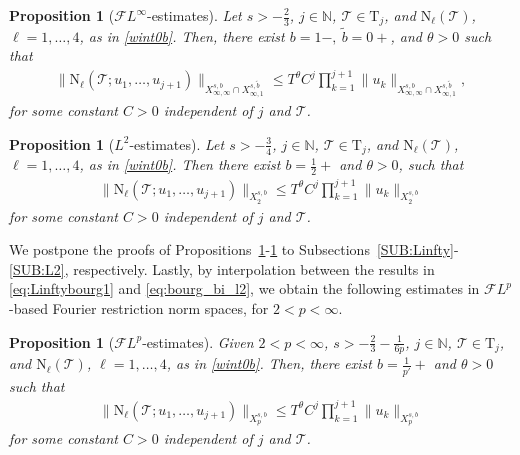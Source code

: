 \documentclass[%
11pt,  reqno]{amsart}
\newcommand{\5}{\textup{V}}
\newcommand{\FL}{\mathcal{F} L}
\newcommand{\wt}{\widetilde}
\newtheorem{proposition}[theorem]{Proposition}
\theoremstyle{remark}
\newcommand{\TT}{\mathcal{T}}
\newcommand{\Tr}{\mathrm{T}}
\newcommand{\bfrak}{\mathfrak{b}}
\newcommand{\gfrak}{\mathfrak{g}}
\newcommand{\ta}{\theta}
\renewcommand{\l}{\ell}
\newcommand{\N}{\mathbb{N}}
\numberwithin{equation}{section}
\numberwithin{theorem}{section}
\newcommand{\NN}{\mathrm{N}}
\begin{document}
\begin{proposition}[$\FL^\infty$-estimates]\label{prop:bourgLinfty}
Let $s>-\frac23$, $j \in\N$, $\TT \in \Tr_j$, and $\NN_\l(\TT)$, $\l=1,\dots, 4$, as in \eqref{wint0b}. Then, there exist 
$b=1-,\ \tilde{b}=0+$, and $\ta>0$ such that
	\begin{align}
		\| \NN_\l(\TT; u_1,\dots, u_{j+1})\|_{X^{s,b}_{\infty, \infty}\cap X^{s,\wt b}_{\infty, 1}} \le T^\ta C^j\prod_{k=1}^{j+1}\|u_k\|_{X^{s,b}_{\infty, \infty}\cap X^{s,\tilde{b}}_{\infty,1}}, \label{eq:Linftybourg1} 
	\end{align}
for some constant $C>0$ independent of $j$ and $\TT$. 
\end{proposition}



\begin{proposition}[$L^2$-estimates]\label{prop:bourgL2}
Let $s>-\frac34$, $j \in\N$, $\TT \in \Tr_j$, and $\NN_\l(\TT)$, $\l=1,\dots,4$, as in \eqref{wint0b}.
	Then there exist $b=\frac12+$ and $\ta>0$, such that
	\begin{align}\label{eq:bourg_bi_l2}
		\| \NN_\l(\TT; u_1,\dots, u_{j+1})\|_{X^{s,b}_{2}}  \le T^\ta C^j\prod_{k=1}^{j+1}\|u_k\|_{X^{s,b}_{2}}
	\end{align}
    for some constant $C>0$ independent of $j$ and $\TT$.
\end{proposition}


We postpone the proofs of Propositions~\ref{prop:bourgLinfty}-\ref{prop:bourgLinfty} to Subsections~\ref{SUB:Linfty}-\ref{SUB:L2}, respectively. Lastly, by interpolation between the results in \eqref{eq:Linftybourg1} and \eqref{eq:bourg_bi_l2}, we obtain the following estimates in $\FL^p$-based Fourier restriction norm spaces, for $2 < p <\infty$. 


\begin{proposition}[$\FL^p$-estimates]\label{prop:bourgLp}
Given $2 < p <\infty$, $s>-\frac{2}{3}-\frac{1}{6p}$, $j\in\N$,  $\TT\in \Tr_{j}$, and $\NN_\l(\TT)$, $\l=1,\dots, 4$, as in \eqref{wint0b}. Then,
there exist $b=\frac{1}{p'}+$ and $\ta>0$ such that
	\begin{align}\label{eq:bourg_bi_lp}
		\| \NN_\l(\TT; u_1,\dots, u_{j+1})\|_{X^{s,b}_{p}}\le T^\ta C^j\prod_{k=1}^{j+1}\|u_k\|_{X^{s,b}_{p}}
	\end{align}
    for some constant $C>0$ independent of $j$ and $\TT$.
\end{proposition}
\end{document}

